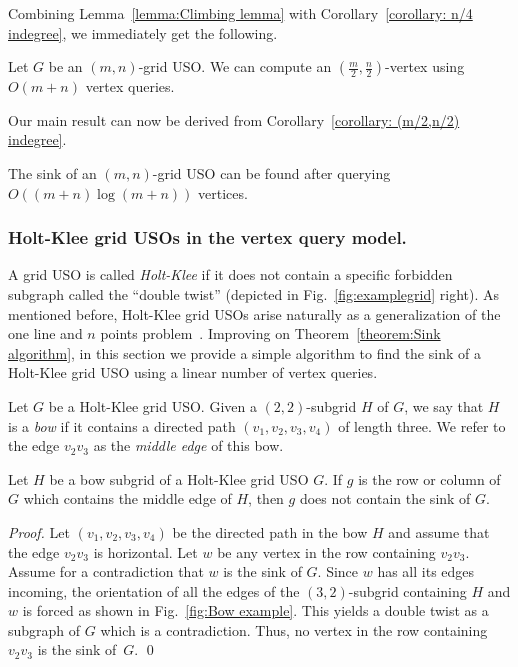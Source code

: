 \documentclass[runningheads,a4paper]{llncs}
\begin{document}
Combining Lemma~\ref{lemma:Climbing lemma}  with Corollary~\ref{corollary: n/4 indegree}, we immediately get the following.
\begin{corollary}[$*$]\label{corollary: (m/2,n/2) indegree}
Let $G$ be an $(m,n)$-grid USO. 
We can compute an $( \frac{m}{2}, \frac{n}{2})$-vertex using $O(m + n)$ vertex queries.
\end{corollary}

Our main result can now be derived from Corollary~\ref{corollary: (m/2,n/2) indegree}.

\begin{theorem}[$*$]\label{theorem:Sink algorithm}
The sink of an $(m,n)$-grid USO can be found after querying $O((m+n)\log (m+n))$ vertices.
\end{theorem}



\subsubsection{Holt-Klee grid USOs in the vertex query model.}
\label{section:Holt-Klee vertex query}

A grid USO is called \emph{Holt-Klee} if it does not contain a specific forbidden subgraph called the ``double twist'' (depicted in Fig.~\ref{fig:examplegrid} right).
As mentioned before, Holt-Klee grid USOs arise naturally as a generalization of the one line and $n$ points problem~\cite{linepoint}.
Improving on Theorem~\ref{theorem:Sink algorithm},
in this section we provide a simple algorithm to find the sink of a Holt-Klee grid USO using a linear number of vertex queries. 

Let $G$ be a Holt-Klee grid USO.
Given a $(2,2)$-subgrid $H$ of $G$, we say that $H$ is a \emph{bow} if it contains a directed path $(v_1, v_2, v_3, v_4)$ of length three. We refer to the edge $v_2 v_3$ as the \emph{middle edge} of this bow.

\begin{lemma}\label{lemma:bow lemma}
Let $H$ be a bow subgrid of a Holt-Klee grid USO $G$. If $g$ is the row or column of $G$ which contains the middle edge of $H$, then $g$ does not contain the sink of $G$.
\end{lemma}
\begin{proof}
Let $(v_1, v_2, v_3,v_4)$ be the directed path in the bow $H$ and assume that the edge $v_2v_3$ is horizontal. 
Let $w$ be any vertex in the row containing $v_2v_3$.  
Assume for a contradiction that $w$ is the sink of $G$. 
Since $w$ has all its edges incoming, the orientation of all the edges of the $(3,2)$-subgrid containing $H$ and $w$ is forced as shown in Fig.~\ref{fig:Bow example}. This yields a double twist as a subgraph of $G$ which is a contradiction. Thus, no vertex in the row containing $v_2v_3$ is the sink of~$G$. \qed
\end{proof}
\end{document}
